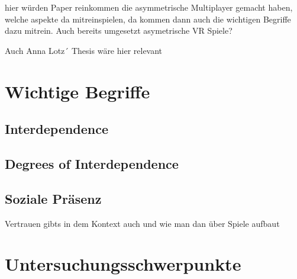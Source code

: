 \cite{harris_asymmetry_2019}
\cite{sajjadi_maze_2014}

hier würden Paper reinkommen die asymmetrische Multiplayer gemacht haben, welche aspekte da mitreinspielen, da kommen dann auch die wichtigen Begriffe dazu mitrein. Auch bereits umgesetzt asymetrische VR Spiele?


Auch Anna Lotz´ Thesis wäre hier relevant


\section{Wichtige Begriffe}

\subsection{Interdependence}
\cite{harris_leveraging_2016}
\cite{depping_cooperation_2017}

\subsection{Degrees of Interdependence}
\cite{beznosyk_effect_2012}

\subsection{Soziale Präsenz}

Vertrauen gibts in dem Kontext auch und wie man dan über Spiele aufbaut

\section{Untersuchungsschwerpunkte}
